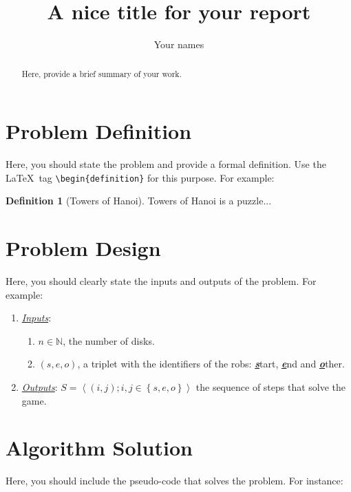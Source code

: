 \documentclass[letterpaper,12pt]{article}
\title{A nice title for your report}
\author{Your names}
\theoremstyle{definition}
\newtheorem{definition}{Definition}[section]
\begin{document}
\maketitle

\begin{abstract}
Here, provide a brief summary of your work.
\end{abstract}

\section{Problem Definition}
Here, you should state the problem and provide a formal definition. Use the \LaTeX\ tag \verb|\begin{definition}| for this purpose. For example:

\begin{definition}[Towers of Hanoi]
Towers of Hanoi is a puzzle...
\end{definition}

\section{Problem Design}
Here, you should clearly state the inputs and outputs of the problem. For example:

\begin{enumerate}
    \item \emph{\underline{Inputs}}:
    \begin{enumerate}
        \item $n \in \mathbb{N}$, the number of disks.
        \item $\left( s, e, o \right)$, a triplet with the identifiers of the robs: \textbf{\emph{\underline{s}}}tart, \textbf{\emph{\underline{e}}}nd and \textbf{\emph{\underline{o}}}ther.
    \end{enumerate}
    \item \emph{\underline{Outputs}}: $S=\left\langle \left(i,j\right);i,j\in\left\{ s,e,o\right\} \right\rangle $ the sequence of steps that solve the game.
\end{enumerate}

\section{Algorithm Solution}
Here, you should include the pseudo-code that solves the problem. For instance:
\end{document}
